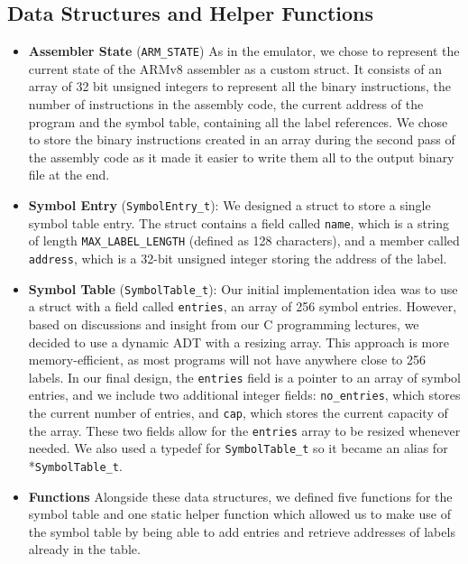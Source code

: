 \documentclass[11pt]{article}
\begin{document}
\subsection{Data Structures and Helper Functions}

\begin{itemize}
    \item \textbf{Assembler State} (\texttt{ARM\_STATE}) As in the emulator, we chose to represent the current state of the ARMv8 assembler as a custom struct. It consists of an array of 32 bit unsigned integers to represent all the binary instructions, the number of instructions in the assembly code, the current address of the program and the symbol table, containing all the label references. We chose to store the binary instructions created in an array during the second pass of the assembly code as it made it easier to write them all to the output binary file at the end.
\end{itemize}

\begin{itemize}
    \item \textbf{Symbol Entry} (\texttt{SymbolEntry\_t}): We designed a struct to store a single symbol table entry. The struct contains a field called \texttt{name}, which is a string of length \texttt{MAX\_LABEL\_LENGTH} (defined as 128 characters), and a member called \texttt{address}, which is a 32-bit unsigned integer storing the address of the label.
    
    \item \textbf{Symbol Table} (\texttt{SymbolTable\_t}): Our initial implementation idea was to use a struct with a field called \texttt{entries}, an array of 256 symbol entries. However, based on discussions and insight from our C programming lectures, we decided to use a dynamic ADT with a resizing array. This approach is more memory-efficient, as most programs will not have anywhere close to 256 labels. In our final design, the \texttt{entries} field is a pointer to an array of symbol entries, and we include two additional integer fields: \texttt{no\_entries}, which stores the current number of entries, and \texttt{cap}, which stores the current capacity of the array. These two fields allow for the \texttt{entries} array to be resized whenever needed. We also used a typedef for \texttt{SymbolTable\_t} so it became an alias for *\texttt{SymbolTable\_t}.
    \item \textbf{Functions} Alongside these data structures, we defined five functions for the symbol table and one static helper function which allowed us to make use of the symbol table by being able to add entries and retrieve addresses of labels already in the table.
\end{itemize}
\end{document}
